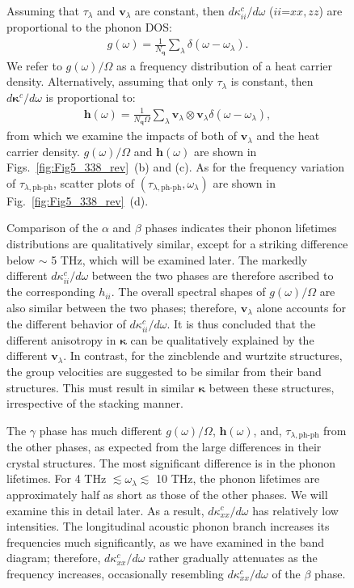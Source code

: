 \documentclass[twocolumn,amsmath,amssymb,a4paper,prb,superscriptaddress,floatfix]{revtex4-1}
\begin{document}
\begin{figure}[h]
Assuming that $\tau_\lambda$ and $\mathbf{v}_\lambda$ are constant, then
$d\kappa_{ii}^c/d\omega$ ($ii$=$xx,zz$) are proportional to the phonon
DOS: 
\begin{align}
 \label{eq:dos}
 g(\omega) = \frac{1}{N_\mathbf{q}}
 \sum_\lambda
 \delta(\omega-\omega_{\lambda}).
\end{align}
We refer to $g(\omega)/\Omega$ as a frequency distribution of a heat
carrier density. Alternatively, assuming that only $\tau_\lambda$ is constant,
then $d\boldsymbol{\kappa}^c/d\omega$ is proportional to:
\begin{align}
 \label{eq:wdos}
 \boldsymbol{h}(\omega) = \frac{1}{N_\mathbf{q}\Omega}
 \sum_\lambda
 \mathbf{v}_\lambda \otimes \mathbf{v}_\lambda
 \delta(\omega-\omega_{\lambda}),
\end{align}
from which we examine the impacts of both of $\mathbf{v}_\lambda$ and the heat carrier
density. $g(\omega)/\Omega$ and  $\boldsymbol{h}(\omega)$
are shown in
Figs.~\ref{fig:Fig5_338_rev}~(b) and (c). As for the frequency
variation of $\tau_{\lambda,\text{ph-ph}}$, scatter
plots of $(\tau_{\lambda,\text{ph-ph}},\omega_\lambda)$ are shown in
Fig.~\ref{fig:Fig5_338_rev}~(d).

Comparison of the $\alpha$ and $\beta$ phases indicates their phonon lifetimes
distributions are qualitatively similar, except for a striking difference below
$\sim$ 5 THz, which will be examined later. The markedly different
$d\kappa_{ii}^c/d\omega$ between the two phases are therefore ascribed to the
corresponding $h_{ii}$. The overall spectral shapes of $g(\omega)/\Omega$ are also
similar between the two phases; therefore, $\mathbf{v}_\lambda$ alone accounts
for the different behavior of $d\kappa_{ii}^c/d\omega$. It is thus concluded
that the different anisotropy in $\boldsymbol{\kappa}$ can be qualitatively
explained by the different $\mathbf{v}_\lambda$.
In contrast, for the zincblende and wurtzite
structures, the group velocities are suggested to be similar from their band
structures\cite{phono3py}.
This must result in similar $\boldsymbol{\kappa}$ between these
structures, irrespective of the stacking manner. 

The $\gamma$ phase has much different $g(\omega)/\Omega$, $\boldsymbol{h}(\omega)$,
and, $\tau_{\lambda,\text{ph-ph}}$ from the other phases, as expected from the
large differences in their crystal structures. The most significant difference
is in the phonon lifetimes. For 4 THz $\lesssim\omega_\lambda\lesssim$ 10 THz,
the phonon lifetimes are approximately half as short as those of the other
phases. We will examine this in detail later. As a result,
$d\kappa_{xx}^c/d\omega$ has relatively low intensities. The longitudinal
acoustic phonon branch increases its frequencies much significantly, as we have
examined in the band diagram; therefore, $d\kappa_{xx}^c/d\omega$ rather
gradually attenuates as the frequency increases, occasionally resembling
$d\kappa_{xx}^c/d\omega$ of the $\beta$ phase.


\end{figure}
\end{document}
